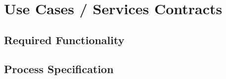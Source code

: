 \documentclass[11pt,a4paper,titlepage]{article}
\begin{document}
		
		
	
	\section{Use Cases / Services Contracts}
		
		
		
	
	\subsection{Required Functionality}
		
		
		
	
	\subsection{Process Specification}
		
		
	

	
\end{document}
